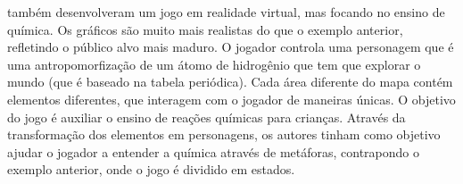 \cite{Alves:2015:VR_Quimica} também desenvolveram um jogo em realidade 
virtual, mas focando no ensino de química. Os gráficos são muito mais 
realistas do que o exemplo anterior, refletindo o público alvo mais 
maduro. O jogador controla uma personagem que é uma antropomorfização 
de um átomo de hidrogênio que tem que explorar o mundo (que é baseado 
na tabela periódica). Cada área diferente do mapa contém elementos 
diferentes, que interagem com o jogador de maneiras únicas. O objetivo 
do jogo é auxiliar o ensino de reações químicas para crianças. Através 
da transformação dos elementos em personagens, os autores tinham como 
objetivo ajudar o jogador a entender a química através de metáforas, 
contrapondo o exemplo anterior, onde o jogo é dividido em estados.
